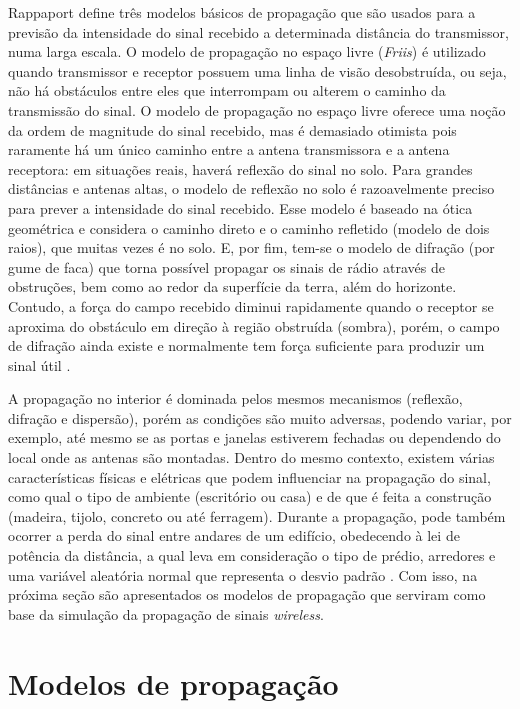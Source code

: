 \documentclass[
	12pt,				%
	twoside,			%
	a4paper,			%
	english,			%
	french,				%
	spanish,			%
	brazil				%
	]{abntex2}
\begin{document}
Rappaport define três modelos básicos de propagação que são usados para
a previsão da intensidade do sinal recebido a determinada distância do
transmissor, numa larga escala. O modelo de propagação no espaço livre
(\emph{Friis}) é utilizado quando transmissor e receptor possuem uma
linha de visão desobstruída, ou seja, não há obstáculos entre eles que
interrompam ou alterem o caminho da transmissão do sinal. O modelo de
propagação no espaço livre oferece uma noção da ordem de magnitude do
sinal recebido, mas é demasiado otimista pois raramente há um único
caminho entre a antena transmissora e a antena receptora: em situações
reais, haverá reflexão do sinal no solo. Para grandes distâncias e
antenas altas, o modelo de reflexão no solo é razoavelmente preciso para
prever a intensidade do sinal recebido. Esse modelo é baseado na ótica
geométrica e considera o caminho direto e o caminho refletido (modelo de
dois raios), que muitas vezes é no solo. E, por fim, tem-se o modelo de
difração (por gume de faca) que torna possível propagar os sinais de
rádio através de obstruções, bem como ao redor da superfície da terra,
além do horizonte. Contudo, a força do campo recebido diminui
rapidamente quando o receptor se aproxima do obstáculo em direção à
região obstruída (sombra), porém, o campo de difração ainda existe e
normalmente tem força suficiente para produzir um sinal útil
\cite[p. 72-83]{RAPPAPORT}.

A propagação no interior é dominada pelos mesmos mecanismos (reflexão,
difração e dispersão), porém as condições são muito adversas, podendo
variar, por exemplo, até mesmo se as portas e janelas estiverem fechadas
ou dependendo do local onde as antenas são montadas. Dentro do mesmo
contexto, existem várias características físicas e elétricas que podem
influenciar na propagação do sinal, como qual o tipo de ambiente
(escritório ou casa) e de que é feita a construção (madeira, tijolo,
concreto ou até ferragem). Durante a propagação, pode também ocorrer a
perda do sinal entre andares de um edifício, obedecendo à lei de
potência da distância, a qual leva em consideração o tipo de prédio,
arredores e uma variável aleatória normal que representa o desvio padrão
\cite[p. 104-108]{RAPPAPORT}. Com isso, na próxima seção são
apresentados os modelos de propagação que serviram como base da
simulação da propagação de sinais \emph{wireless}.

\section{Modelos de propagação}\label{sec:modelos}
\end{document}
